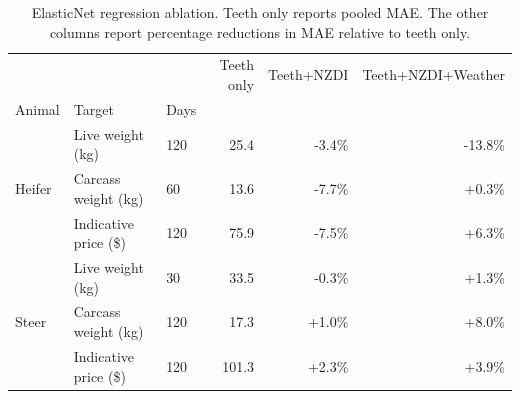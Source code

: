 \begin{table}
\caption{ElasticNet regression ablation. Teeth only reports pooled MAE. The other columns report percentage reductions in MAE relative to teeth only.}
\label{tab:beef_regression_elasticnet_ablation}
\begin{tabular}{lllrrr}
\toprule
 &  &  & Teeth only & Teeth+NZDI & Teeth+NZDI+Weather \\
Animal & Target & Days &  &  &  \\
\midrule
\multirow[c]{3}{*}{Heifer} & Live weight (kg) & 120 & 25.4 & -3.4\% & -13.8\% \\
 & Carcass weight (kg) & 60 & 13.6 & -7.7\% & +0.3\% \\
 & Indicative price (\$) & 120 & 75.9 & -7.5\% & +6.3\% \\
\multirow[c]{3}{*}{Steer} & Live weight (kg) & 30 & 33.5 & -0.3\% & +1.3\% \\
 & Carcass weight (kg) & 120 & 17.3 & +1.0\% & +8.0\% \\
 & Indicative price (\$) & 120 & 101.3 & +2.3\% & +3.9\% \\
\bottomrule
\end{tabular}
\end{table}

